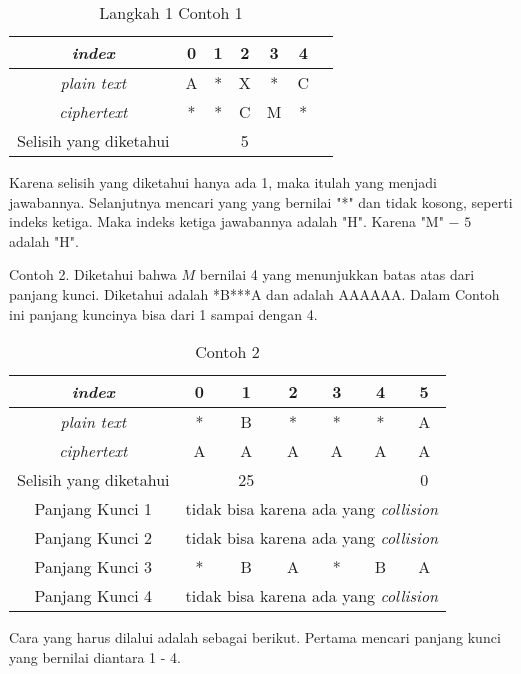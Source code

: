 	\begin{table}[H]
	 	\centering
		\caption{Langkah 1 Contoh 1}	 	
	 	\setlength{\arrayrulewidth}{.08em}
	 	\begin{tabular}{|c|c|c|c|c|c|c|}\hline
	 	\textit{index}&0&1&2&3&4\\ \hline
	 	\textit{plain text}&\cellcolor{blue!15}A&\cellcolor{lime!15}*&\cellcolor{yellow!25}X&\cellcolor{green!15}*&\cellcolor{pink!25}C\\ \hline
	 	\textit{ciphertext}&\cellcolor{blue!15}*&\cellcolor{lime!15}*&\cellcolor{yellow!25}C&\cellcolor{green!15}M&\cellcolor{pink!25}*\\ \hline
	 	Selisih yang diketahui& & &5& & \\ \hline
	 	\end{tabular}
	 	\label{tab:langkah1contoh1}
	\end{table}
	
	  Karena selisih yang diketahui hanya ada 1, maka itulah yang menjadi jawabannya. Selanjutnya mencari yang \plaintext yang bernilai "*" dan \ciphertext tidak kosong, seperti indeks ketiga. Maka indeks ketiga jawabannya adalah "H". Karena "M" $-$ $5$ adalah "H".
	 
	 
	 
	 Contoh 2. Diketahui bahwa $M$ bernilai 4 yang menunjukkan batas atas dari panjang kunci. Diketahui \plaintext adalah *B***A dan \ciphertext adalah AAAAAA. Dalam Contoh ini panjang kuncinya bisa dari 1 sampai dengan 4. 
	 \begin{table}[H]
	 	\centering
	 	\caption{Contoh 2}
	 	\begin{tabular}{|c|c|c|c|c|c|c|}\hline
		\textit{index}&0&1&2&3&4&5\\ \hline
	 	\textit{plain text}&*&B&*&*&*&A\\ \hline
	 	\textit{ciphertext}&A&A&A&A&A&A\\ \hline
	 	Selisih yang diketahui& &25& & & &0\\ \hline
	 	Panjang Kunci 1 & \multicolumn{6}{c|}{tidak bisa karena ada yang \textit{collision}}\\ \hline
	 	Panjang Kunci 2 & \multicolumn{6}{c|}{tidak bisa karena ada yang \textit{collision}}\\ \hline
	 	Panjang Kunci 3 &*&B&A&*&B&A \\ \hline
	 	Panjang Kunci 4 & \multicolumn{6}{c|}{tidak bisa karena ada yang \textit{collision}}\\ \hline
	 	\end{tabular}
	 	\label{tab:contoh2}
	\end{table}
	Cara yang harus dilalui adalah sebagai berikut. Pertama mencari panjang kunci yang bernilai diantara 1 - 4. \\
	
